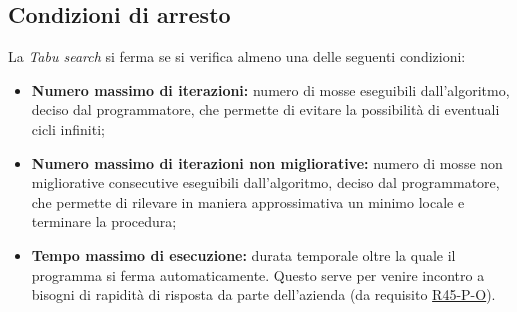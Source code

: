 \subsection{Condizioni di arresto}
\label{sec:condizioni-arresto}
\noindent La \textit{Tabu search} si ferma se si verifica almeno una delle seguenti condizioni:
\begin{itemize}
    \item \textbf{Numero massimo di iterazioni:} numero di mosse eseguibili dall'algoritmo, deciso
    dal programmatore, che permette di evitare la possibilità di eventuali cicli infiniti;
    \item \textbf{Numero massimo di iterazioni non migliorative:} numero di mosse non migliorative
    consecutive eseguibili dall'algoritmo, deciso dal programmatore, che permette
    di rilevare in maniera approssimativa un minimo
    locale e terminare la procedura;
    \item \textbf{Tempo massimo di esecuzione:}  durata temporale oltre
    la quale il programma si ferma automaticamente. Questo serve per venire incontro a
    bisogni di rapidità di risposta da parte dell’azienda (da requisito \hyperref[tab:requisiti-di-performance]{R45-P-O}).
    
\end{itemize}
